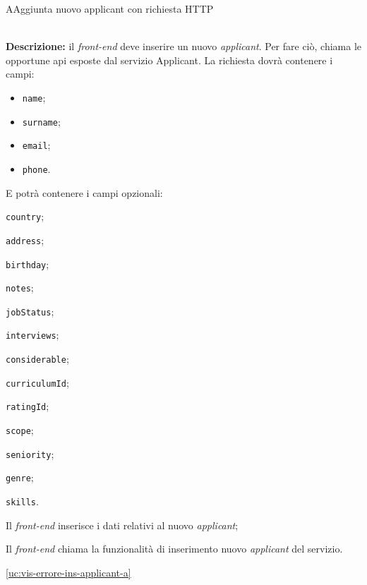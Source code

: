 \begin{usecase}{7}{A}{Aggiunta nuovo applicant con richiesta HTTP}


	\textbf{\\Descrizione:} il \textit{front-end} deve inserire un nuovo \textit{applicant}. Per fare ciò,
	chiama le opportune \acrshort{api} esposte dal servizio Applicant. La richiesta dovrà contenere i campi:
	\begin{itemize}[noitemsep]
		\item \texttt{name};
		\item \texttt{surname};
		\item \texttt{email};
		\item \texttt{phone}.
	\end{itemize}
	E potrà contenere i campi opzionali:
	\begin{ucitemize}
		\item \texttt{country};
		\item \texttt{address};
		\item \texttt{birthday};
		\item \texttt{notes};
		\item \texttt{jobStatus};
		\item \texttt{interviews};
		\item \texttt{considerable};
		\item \texttt{curriculumId};
		\item \texttt{ratingId};
		\item \texttt{scope};
		\item \texttt{seniority};
		\item \texttt{genre};
		\item \texttt{skills}.
	\end{ucitemize}

	\begin{ucscenarioprincipale}
		\item Il \textit{front-end} inserisce i dati relativi al nuovo \textit{applicant};
		\item Il \textit{front-end} chiama la funzionalità di inserimento nuovo \textit{applicant} del servizio.
	\end{ucscenarioprincipale}


	\begin{ucestensioni}
		\item \ref{uc:vis-errore-ins-applicant-a}
	\end{ucestensioni}

	\label{uc:richiesta-aggiunta-applicant-a}
\end{usecase}

